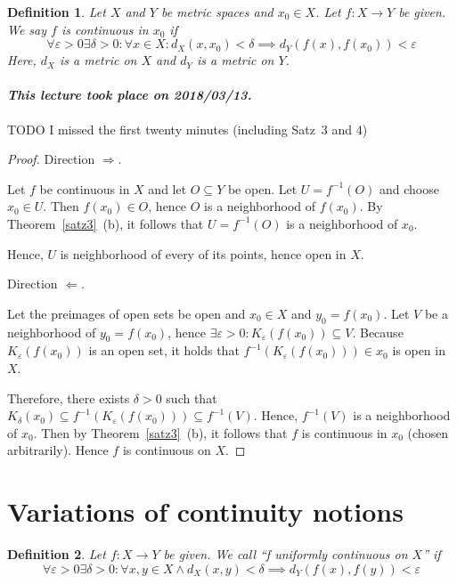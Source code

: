 \documentclass{article}
\newtheorem{definition}{Definition}  \numberwithin{definition}{section}
\newcommand{\dateref}[1]{\paragraph{\textit{This lecture took place on #1.}}}
\begin{document}
\begin{definition}
  Let $X$ and $Y$ be metric spaces and $x_0 \in X$.
  Let $f: X \to Y$ be given. We say $f$ is continuous in $x_0$ if
  \[ \forall \varepsilon > 0 \exists \delta > 0: \forall x \in X: d_X(x, x_0) < \delta \implies d_Y(f(x), f(x_0)) < \varepsilon \]
  Here, $d_X$ is a metric on $X$ and $d_Y$ is a metric on $Y$.
\end{definition}

\dateref{2018/03/13}

TODO I missed the first twenty minutes (including Satz~3 and 4)

\begin{proof}
  Direction $\Rightarrow$.

  Let $f$ be continuous in $X$ and let $O \subseteq Y$ be open. Let $U = f^{-1}(O)$ and choose $x_0 \in U$. Then $f(x_0) \in O$, hence $O$ is a neighborhood of $f(x_0)$. By Theorem~\ref{satz3}~(b), it follows that $U = f^{-1}(O)$ is a neighborhood of $x_0$.

  Hence, $U$ is neighborhood of every of its points, hence open in $X$.

  Direction $\Leftarrow$.

  Let the preimages of open sets be open and $x_0 \in X$ and $y_0 = f(x_0)$.
  Let $V$ be a neighborhood of $y_0 = f(x_0)$, hence $\exists \varepsilon > 0: K_{\varepsilon}(f(x_0)) \subseteq V$. Because $K_{\varepsilon}(f(x_0))$ is an open set, it holds that $f^{-1}(K_{\varepsilon}(f(x_0))) \in x_0$ is open in $X$.

  Therefore, there exists $\delta > 0$ such that $K_{\delta}(x_0) \subseteq f^{-1}(K_{\varepsilon}(f(x_0))) \subseteq f^{-1}(V)$. Hence, $f^{-1}(V)$ is a neighborhood of $x_0$. Then by Theorem~\ref{satz3}~(b), it follows that $f$ is continuous in $x_0$ (chosen arbitrarily). Hence $f$ is continuous on $X$.
\end{proof}

\section{Variations of continuity notions}

\begin{definition} %
  Let $f: X \to Y$ be given.
  We call \enquote{f uniformly continuous on $X$} if
  \[
  	\forall \varepsilon > 0 \exists \delta > 0:
  	\forall x, y \in X \land d_X(x,y) < \delta \implies d_Y(f(x), f(y)) < \varepsilon
  \]
\end{definition}
\end{document}
